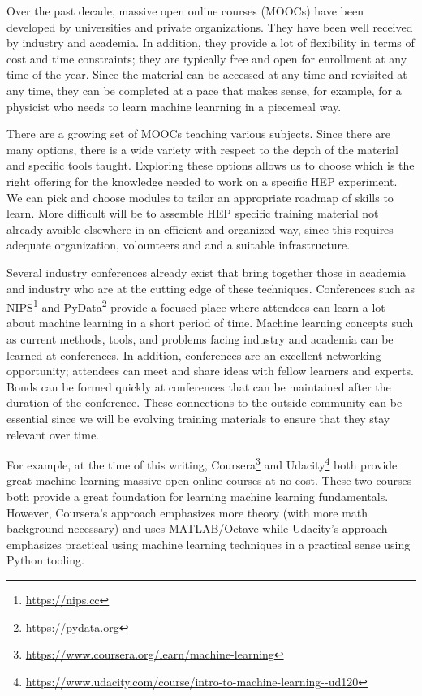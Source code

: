 Over the past decade, massive open online courses (MOOCs) have been developed by universities and private organizations. They have been well received by industry and academia.%
In addition, they provide a lot of flexibility in terms of cost and time constraints; they are typically free and open for enrollment at any time of the year. Since the material can be accessed at any time and revisited at any time, they can be completed at a pace that makes sense, for example, for a physicist who needs to learn machine leanrning in a piecemeal way.

There are a growing set of MOOCs teaching various subjects. Since there are many options, there is a wide variety with respect to the depth of the material and specific tools taught. Exploring these options allows us to choose which is the right offering for the knowledge needed to work on a specific HEP experiment. We can pick and choose modules to tailor an appropriate roadmap of skills to learn.
More difficult will be to assemble HEP specific training material not already avaible elsewhere in an efficient and organized way, since this requires adequate organization, volounteers and and a suitable infrastructure. 

Several industry conferences already exist that bring together those in academia and industry who are at the cutting edge of these techniques. Conferences such as NIPS\footnote{\url{https://nips.cc}} and PyData\footnote{\url{https://pydata.org}} provide a focused place where attendees can learn a lot about machine learning in a short period of time. Machine learning concepts such as current methods, tools, and problems facing industry and academia can be learned at conferences. In addition, conferences are an excellent networking opportunity; attendees can meet and share ideas with fellow learners and experts. Bonds can be formed quickly at conferences that can be maintained after the duration of the conference. These connections to the outside community can be essential since we will be evolving training materials to ensure that they stay relevant over time.

For example, at the time of this writing, Coursera\footnote{\url{https://www.coursera.org/learn/machine-learning}} and Udacity\footnote{\url{https://www.udacity.com/course/intro-to-machine-learning--ud120}} both provide great machine learning massive open online courses at no cost. These two courses both provide a great foundation for learning machine learning fundamentals. However, Coursera's approach emphasizes more theory (with more math background necessary) and uses MATLAB/Octave while Udacity's approach emphasizes practical using machine learning techniques in a practical sense using Python tooling. 

